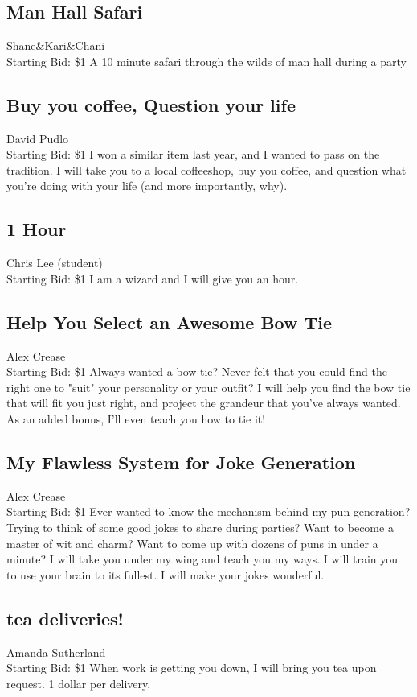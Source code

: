 \documentclass[11pt]{article}
\begin{document}
\subsection{Man Hall Safari}
Shane\&Kari\&Chani
\\
Starting Bid: \$1
\newline
 A 10 minute safari through the wilds of man hall during a party
\subsection{Buy you coffee, Question your life}
David Pudlo
\\
Starting Bid: \$1
\newline
I won a similar item last year, and I wanted to pass on the tradition. I will take you to a local coffeeshop, buy you coffee, and question what you're doing with your life (and more importantly, why).
\subsection{1 Hour}
Chris Lee (student)
\\
Starting Bid: \$1
\newline
I am a wizard and I will give you an hour.
\subsection{Help You Select an Awesome Bow Tie}
Alex Crease
\\
Starting Bid: \$1
\newline
Always wanted a bow tie? Never felt that you could find the right one to  "suit" your personality or your outfit? I will help you find the bow tie that will fit you just right, and project the grandeur that you've always wanted. As an added bonus, I'll even teach you how to tie it!
\subsection{My Flawless System for Joke Generation}
Alex Crease
\\
Starting Bid: \$1
\newline
Ever wanted to know the mechanism behind my pun generation? Trying to think of some good jokes to share during parties? Want to become a master of wit and charm? Want to come up with dozens of puns in under a minute? I will take you under my wing and teach you my ways. I will train you to use your brain to its fullest. I will make your jokes wonderful.
\subsection{tea deliveries! }
Amanda Sutherland
\\
Starting Bid: \$1
\newline
When work is getting you down, I will bring you tea upon request. 1 dollar per delivery.
\end{document}
